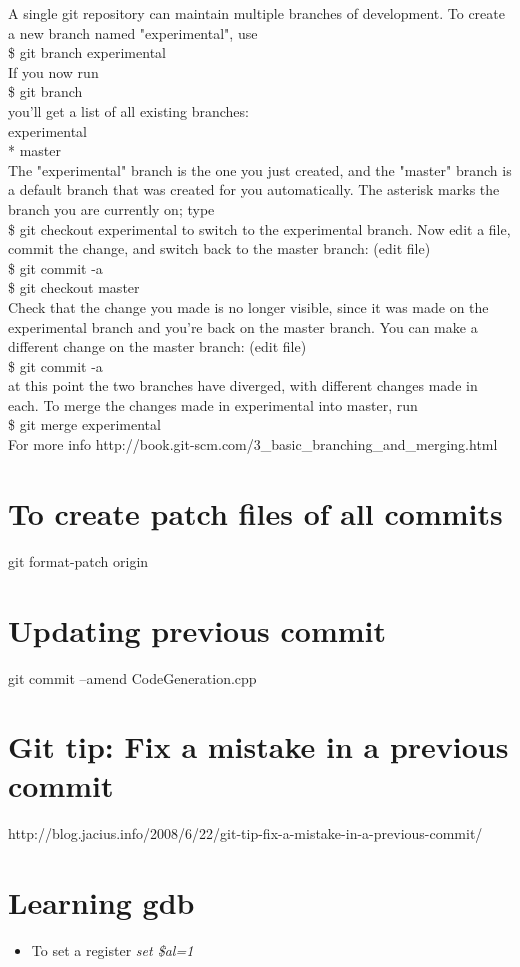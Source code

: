 \documentclass[a4paper,10pt]{article}
\begin{document}
A single git repository can maintain multiple branches of development. To create a new branch named "experimental", use\\
\$ git branch experimental\\
If you now run\\
\$ git branch\\
you'll get a list of all existing branches:\\
experimental\\
* master\\
	The "experimental" branch is the one you just created, and the "master" branch is a default branch that was created for you automatically. The asterisk marks the branch you are currently on; type\\
\$ git checkout experimental
	to switch to the experimental branch. Now edit a file, commit the change, and switch back to the master branch:
	(edit file)\\
\$ git commit -a\\
\$ git checkout master\\
Check that the change you made is no longer visible, since it was made on the experimental branch and you're back on the master branch.
	You can make a different change on the master branch:
	(edit file)\\
\$ git commit -a\\
at this point the two branches have diverged, with different changes made in each. To merge the changes made in experimental into master, run\\
\$ git merge experimental\\

For more info http://book.git-scm.com/3\_basic\_branching\_and\_merging.html\\

\section{To create patch files of all commits}
git format-patch origin
\section{Updating previous commit}

git commit --amend CodeGeneration.cpp
\section{Git tip: Fix a mistake in a previous commit}

http://blog.jacius.info/2008/6/22/git-tip-fix-a-mistake-in-a-previous-commit/
\section{Learning gdb}

\begin{itemize}
\item To set a register \emph{set \$al=1}
\end{itemize}
\end{document}

